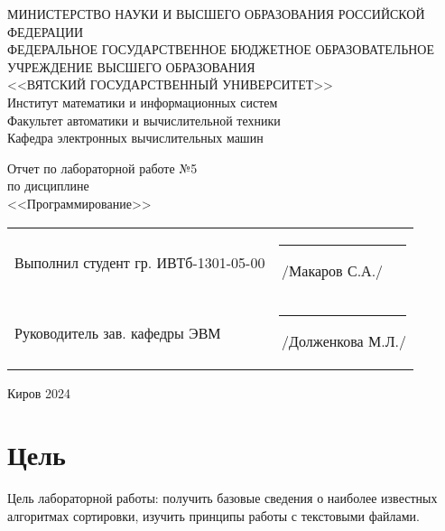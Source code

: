 \documentclass[a4paper,14pt]{extarticle}
\begin{document}
	\newpage\thispagestyle{empty}
	\begin{center}
		\MakeUppercase{
			Министерство науки и высшего образования Российской Федерации\\
			Федеральное государственное бюджетное образовательное учреждение высшего образования\\
			<<Вятский Государственный Университет>>\\
		}
		Институт математики и информационных систем\\
		Факультет автоматики и вычислительной техники\\
		Кафедра электронных вычислительных машин
	\end{center}
	\vfill
	
	\begin{center}
		Отчет по лабораторной работе №5\\
		по дисциплине\\
		<<Программирование>>\\
	\end{center}
	\vfill
	
	\noindent
	\begin{tabular}{ll}
		Выполнил студент гр. ИВТб-1301-05-00 \hspace{5mm} &
		\rule[-1mm]{25mm}{0.10mm}\,/Макаров С.А./\\
		
		Руководитель зав. кафедры ЭВМ & \rule[-1mm]{25mm}{0.10mm}\,/Долженкова М.Л./\\
	\end{tabular}
	
	\vfill
	\begin{center}
		Киров 2024
	\end{center}
	
	\newpage
	\section*{Цель}
	Цель лабораторной работы: получить базовые сведения о наиболее известных алгоритмах сортировки, изучить принципы работы с текстовыми файлами.
	
\end{document}
